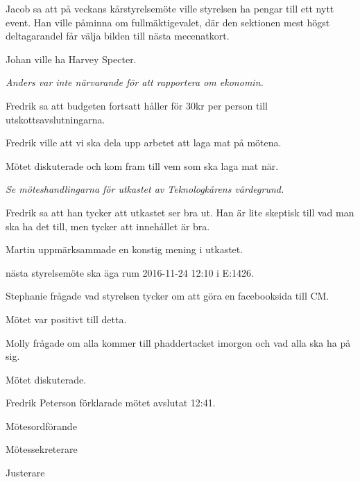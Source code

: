 \documentclass[10pt]{article}
\def\mo{Fredrik Peterson}
\def\ms{Erik Månsson}
\def\ji{Martin Gemborn Nilsson}
\begin{document}
\begin{paragrafer}
\begin{paragrafer}
Jacob sa att på veckans kårstyrelsemöte ville styrelsen ha pengar till ett nytt event. Han ville påminna om fullmäktigevalet, där den sektionen mest högst deltagarandel får välja bilden till nästa mecenatkort.

Johan ville ha Harvey Specter.

\emph{Anders var inte närvarande för att rapportera om ekonomin.}

\end{paragrafer}

Fredrik sa att budgeten fortsatt håller för 30kr per person till utskottsavslutningarna.

Fredrik ville att vi ska dela upp arbetet att laga mat på mötena.

Mötet diskuterade och kom fram till vem som ska laga mat när.

\emph{Se möteshandlingarna för utkastet av Teknologkårens värdegrund.}

Fredrik sa att han tycker att utkastet ser bra ut. Han är lite skeptisk till vad man ska ha det till, men tycker att innehållet är bra.

Martin uppmärksammade en konstig mening i utkastet.

{\Mba} nästa styrelsemöte ska äga rum 2016-11-24 12:10 i E:1426.

{\Ibfu}

Stephanie frågade vad styrelsen tycker om att göra en facebooksida till CM.

Mötet var positivt till detta.

Molly frågade om alla kommer till phaddertacket imorgon och vad alla ska ha på sig.

Mötet diskuterade.

{\mo} förklarade mötet avslutat 12:41.

\end{paragrafer}

\hidesignfoot
\begin{signatures}{3}
\signature{\mo}{Mötesordförande}
\signature{\ms}{Mötessekreterare}
\signature{\ji}{Justerare}
\end{signatures}
\end{document}
